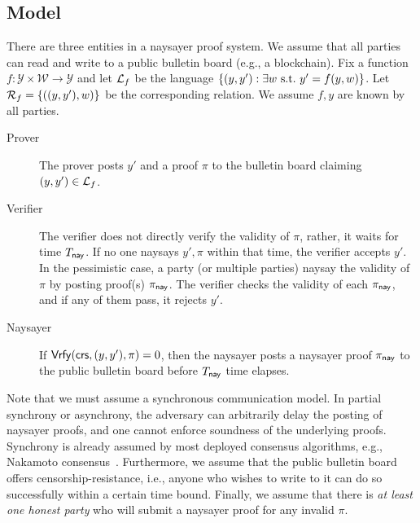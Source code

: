 \subsection{Model}

There are three entities in a naysayer proof system. We assume that all parties can read and write to a public bulletin board (e.g., a blockchain). Fix a function $f: \mathcal{Y} \times \mathcal{W} \to \mathcal{Y}$ and let $\mathcal{L}_f$ be the language $\{(y, y'): \exists w \mathrm{~s.t.~} y' = f(y, w)\}$. Let $\mathcal{R}_f = \{((y, y'), w)\}$ be the corresponding relation. We assume $f,y$ are known by all parties.
\begin{description}
    \item[Prover] The prover posts $y'$ and a proof $\pi$ to the bulletin board claiming $(y,y') \in \mathcal{L}_f$. 
    \item[Verifier] The verifier does not directly verify the validity of $\pi$, rather, it waits for time $T_{\mathsf{nay}}$.
    If no one naysays $y', \pi$ within that time, the verifier accepts $y'$. In the pessimistic case, a party (or multiple parties) naysay the validity of $\pi$ by posting proof(s) $\pi_{\mathsf{nay}}$. The verifier checks the validity of each $\pi_{\mathsf{nay}}$, and if any of them pass, it rejects $y'$.
    \item[Naysayer] If $\mathsf{Vrfy}(\mathsf{crs}, (y,y'),\pi)=0$, then the naysayer posts a naysayer proof $\pi_{\mathsf{nay}}$ to the public bulletin board before $T_{\mathsf{nay}}$ time elapses.
\end{description}

Note that we must assume a synchronous communication model. In partial synchrony or asynchrony, the adversary can arbitrarily delay the posting of naysayer proofs, and one cannot enforce soundness of the underlying proofs. Synchrony is already assumed by most deployed consensus algorithms, e.g., Nakamoto consensus~\cite{Nakamoto08}. Furthermore, we assume that the public bulletin board offers censorship-resistance, i.e., anyone who wishes to write to it can do so successfully within a certain time bound. Finally, we assume that there is \emph{at least one honest party} who will submit a naysayer proof for any invalid $\pi$.